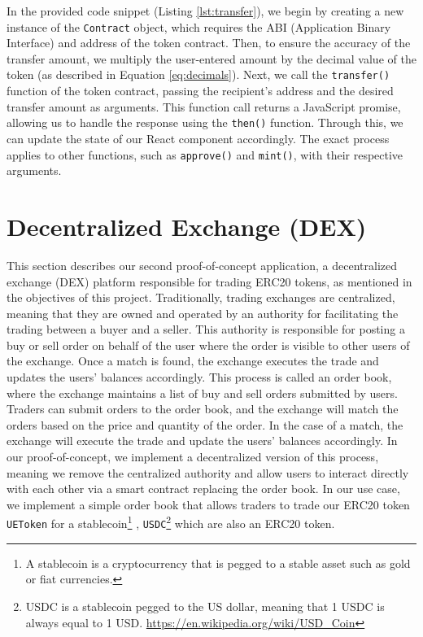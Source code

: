 In the provided code snippet (Listing \ref{lst:transfer}), we begin by creating a new instance of the \texttt{Contract} object, which requires the ABI (Application Binary Interface) and address of the token contract. Then, to ensure the accuracy of the transfer amount, we multiply the user-entered amount by the decimal value of the token (as described in Equation \ref{eq:decimals}).
Next, we call the \texttt{transfer()} function of the token contract, passing the recipient's address and the desired transfer amount as arguments. This function call returns a JavaScript promise, allowing us to handle the response using the \texttt{then()} function. Through this, we can update the state of our React component accordingly. The exact process applies to other functions, such as \texttt{approve()} and \texttt{mint()}, with their respective arguments.




\section{Decentralized Exchange (DEX)}
\label{sec:dex}

This section describes our second proof-of-concept application, a decentralized exchange (DEX) platform responsible for trading ERC20 tokens,
as mentioned in the objectives of this project. Traditionally, trading exchanges are centralized, meaning that they are owned and operated by
an authority for facilitating the trading between a buyer and a seller. This authority is responsible for posting a buy or sell order on behalf
of the user where the order is visible to other users of the exchange. Once a match is found, the exchange executes the trade and updates the
users' balances accordingly. This process is called an order book, where the exchange maintains a list of buy and sell orders
submitted by users. Traders can submit orders to the order book, and the exchange will match the orders based on the price and quantity of the
order. In the case of a match, the exchange will execute the trade and update the users' balances accordingly. In our proof-of-concept, we
implement a decentralized version of this process, meaning we remove the centralized authority and allow users to interact directly with each other
via a smart contract replacing the order book. In our use case, we implement a simple order book that allows traders to trade our ERC20 token
\texttt{UEToken} for a stablecoin\footnote{A stablecoin is a cryptocurrency that is pegged to a stable asset such as gold or fiat currencies.}
, \texttt{USDC}\footnote{USDC is a stablecoin pegged to the US dollar, meaning that 1 USDC is always equal to 1 USD. \url{https://en.wikipedia.org/wiki/USD_Coin} }
which are also an ERC20 token.


